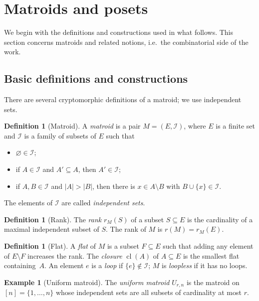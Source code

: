 \documentclass[11pt,a4paper]{article}
\numberwithin{equation}{section}
\theoremstyle{plain}
\theoremstyle{definition}
\newtheorem{definition}[theorem]{Definition}
\newtheorem{example}[theorem]{Example}
\theoremstyle{remark}
\newcommand{\cI}{\mathcal{I}}
\DeclareMathOperator{\cl}{cl}
\begin{document}
\section{Matroids and posets}\label{sec:matroids}

We begin with the definitions and constructions used in what follows. This section concerns matroids and related notions, i.e.\ the combinatorial side of the work.

\subsection{Basic definitions and constructions}

There are several cryptomorphic definitions of a matroid; we use independent sets.

\begin{definition}[Matroid]\label{def:matroid}
A \emph{matroid} is a pair $M=(E,\cI)$, where $E$ is a finite set and $\cI$ is a family of subsets of $E$ such that
\begin{itemize}[nosep]
\item $\varnothing\in\cI$;
\item if $A\in\cI$ and $A'\subseteq A$, then $A'\in\cI$;
\item if $A,B\in\cI$ and $|A|>|B|$, then there is $x\in A\setminus B$ with $B\cup\{x\}\in\cI$.
\end{itemize}
The elements of $\cI$ are called \emph{independent sets}.
\end{definition}

\begin{definition}[Rank]
The \emph{rank} $r_M(S)$ of a subset $S\subseteq E$ is the cardinality of a maximal independent subset of $S$. The rank of $M$ is $r(M)=r_M(E)$.
\end{definition}

\begin{definition}[Flat]
A \emph{flat} of $M$ is a subset $F\subseteq E$ such that adding any element of $E\setminus F$ increases the rank. The \emph{closure} $\cl(A)$ of $A\subseteq E$ is the smallest flat containing~$A$. An element $e$ is a \emph{loop} if $\{e\}\notin\cI$; $M$ is \emph{loopless} if it has no loops.
\end{definition}

\begin{example}[Uniform matroid]
The \emph{uniform matroid} $U_{r,n}$ is the matroid on $[n]=\{1,\dots,n\}$ whose independent sets are all subsets of cardinality at most $r$.
\end{example}
\end{document}
